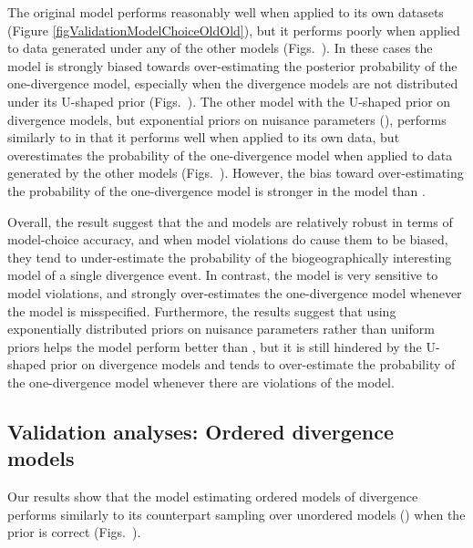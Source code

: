 \documentclass[letterpaper,12pt]{article}
\begin{document}
\begin{linenumbers}
The original \msb model \modelOld performs reasonably well when applied
to its own datasets (Figure \ref{figValidationModelChoiceOldOld}), but
it performs poorly when applied to data generated under any of the other
models (Figs.\
).
In these cases the \modelOld model is strongly biased towards over-estimating
the posterior probability of the one-divergence model, especially when the
divergence models are not distributed under its U-shaped prior (Figs.\
).
The other model with the U-shaped prior on divergence models, but exponential
priors on nuisance parameters (\modelUshaped), performs similarly to \modelOld
in that it performs well when applied to its own data, but overestimates
the probability of the one-divergence model when applied to data generated
by the other models (Figs.\
).
However, the bias toward over-estimating the probability of the one-divergence
model is stronger in the \modelOld model than \modelUshaped.

Overall, the result suggest that the \modelDPP and \modelUniform models are
relatively robust in terms of model-choice accuracy, and when model violations
do cause them to be biased, they tend to under-estimate the probability of
the biogeographically interesting model of a single divergence event.
In contrast, the \modelOld model is very sensitive to model violations,
and strongly over-estimates the one-divergence model whenever the model
is misspecified.
Furthermore, the results suggest that using exponentially distributed priors on
nuisance parameters rather than uniform priors helps the \modelUshaped model
perform better than \modelOld, but it is still hindered by the U-shaped prior
on divergence models and tends to over-estimate the probability of the
one-divergence model whenever there are violations of the model.


\subsection*{Validation analyses: Ordered divergence models}
Our results show that the model estimating ordered models of divergence
\modelDPPOrdered performs similarly to its counterpart sampling over
unordered models (\modelDPP) when the prior is correct (Figs.\
).


\end{linenumbers}
\end{document}
